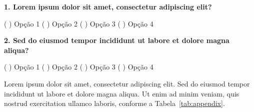\newpage
\begingroup
\setlength{\parindent}{0pt}


\textbf{1. Lorem ipsum dolor sit amet, consectetur adipiscing elit?}

\vspace{4pt}
( ) Opção 1 \quad ( ) Opção 2 \quad ( ) Opção 3 \quad ( ) Opção 4

\vspace{10pt}

\textbf{2. Sed do eiusmod tempor incididunt ut labore et dolore magna aliqua?}

\vspace{4pt}
( ) Opção 1 \quad ( ) Opção 2 \quad ( ) Opção 3 \quad ( ) Opção 4

\newpage


Lorem ipsum dolor sit amet, consectetur adipiscing elit. Sed do eiusmod tempor incididunt ut labore et dolore magna aliqua. Ut enim ad minim veniam, quis nostrud exercitation ullamco laboris, conforme a Tabela~\ref{tab:appendix}.

